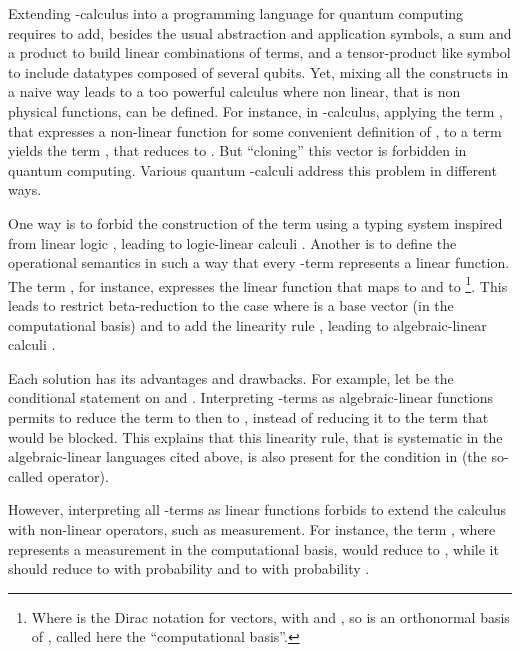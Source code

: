 \documentclass[preprint]{elsarticle}
\begin{document}
Extending -calculus into a programming language for quantum computing
requires to add, besides the usual abstraction and application symbols, a sum
and a product to build linear combinations of terms, and a tensor-product like
symbol to include datatypes composed of several qubits. Yet, mixing all the
constructs in a naive way leads to a too powerful calculus where non linear,
that is non physical functions, can be defined. For instance, in -calculus, applying the term , that
expresses a non-linear function for some convenient definition of , to
a term  yields the term , that reduces to . But ``cloning'' this vector  is forbidden in quantum computing.
Various quantum -calculi address this problem in different ways.

One way is to forbid the construction of the term 
using a typing system inspired from linear logic
\cite{GirardTCS87,AbramskyTCS93}, leading to logic-linear calculi
\cite{AltenkirchGrattageLICS05,SelingerValironSTQC09,GreenLeFanulumsdaineRossSelingerValironPLDI13,PaganiSelingerValironPOPL14,ZorziMSCS16}.
Another is to define the operational semantics in such a way that every -term represents a linear function. The term
, for instance, expresses the linear function that maps
 to  and  to \footnote{Where  is the Dirac notation for vectors, with  and
  ,
  so  is an orthonormal basis of , called here
  the ``computational basis''.}. This leads to restrict beta-reduction to the
case where  is a base vector (in the computational basis) and to add the
linearity rule , leading to
algebraic-linear calculi \cite{ArrighiDowekRTA08, ArrighiDiazcaroLMCS12,
  DiazcaroPetitWoLLIC12,
  ArrighiDiazcaroValironIC17,AssafDiazcaroPerdrixTassonValironLMCS14}.

Each solution has its advantages and drawbacks. For example, let  be
the conditional statement on  and . Interpreting -terms
as algebraic-linear functions permits to reduce the term  to
 then to , instead of reducing it to the term  that would be blocked. This explains that
this linearity rule, that is systematic in the algebraic-linear languages cited
above, is also present for the condition in \cite{AltenkirchGrattageLICS05} (the
so-called  operator).

However, interpreting all -terms as linear functions forbids to extend
the calculus with non-linear operators, such as measurement. For instance, the
term , where  represents a
measurement in the computational basis, would reduce to , while it should reduce to  with
probability  and to  with probability .
\end{document}
